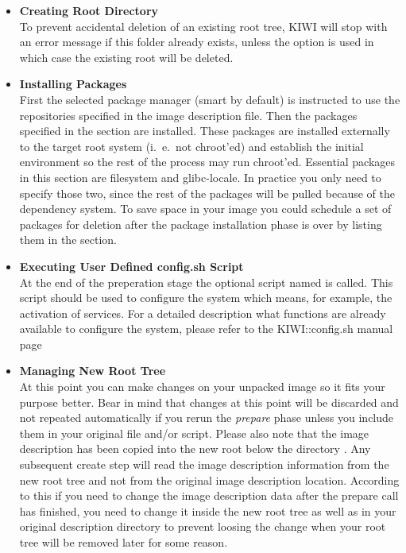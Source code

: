 \begin{itemize}
\item \textbf{Creating Root Directory}\\
      To prevent accidental deletion of an existing root tree, KIWI will
      stop with an error message if this folder already exists, unless the
      option  is used in which case the existing root will
      be deleted.
\item \textbf{Installing Packages}\\
      First the selected package manager (smart by default) is instructed to
      use the repositories specified in the image description file.
      Then the packages specified in the  section are installed.
      These packages are installed externally to the target root system
      (i.~e.\ not chroot'ed) and establish the initial environment so the rest
      of  the process may run chroot'ed. Essential packages in this section
      are filesystem and glibc-locale. In practice you only need to
      specify those two, since the rest of the packages will be pulled
      because of the dependency system. To save space in your image you
      could schedule a set of packages for deletion after the package
      installation phase is over by listing them in the  section.
\item \textbf{Executing User Defined config.sh Script}\\
      At the end of the preperation stage the optional script named 
      is called. This script should be used to configure the system which means,
      for example, the activation of services. For a detailed description what
      functions are already available to configure the system, please refer to
      the KIWI::config.sh manual page
\item \textbf{Managing New Root Tree}\\
      At this point you can make changes on your unpacked image so it fits
      your purpose better. Bear in mind that changes at this point will be
      discarded and not repeated automatically if you rerun the \emph{prepare}
      phase unless you include them in your original  file and/or
       script. Please also note that the image description has
      been copied into the new root below the directory
      . Any subsequent create step will read
      the image description information from the new root tree and not
      from the original image description location. According to this
      if you need to change the image description data
      after the prepare call has finished, you need to change it inside the
      new root tree as well as in your original description directory to
      prevent loosing the change when your root tree will be removed later
      for some reason.
\end{itemize}

